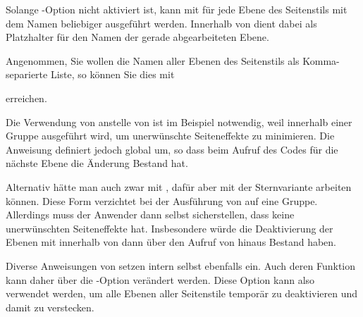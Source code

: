 \begin{Declaration}
\end{Declaration}
%
%
Solange \KOMAScript-Option  nicht
aktiviert ist, kann mit  für jede Ebene des
Seitenstils mit dem Namen  beliebiger 
ausgeführt werden. Innerhalb von  dient dabei  als
Platzhalter für den Namen der gerade abgearbeiteten Ebene.
\begin{Example}
  Angenommen, Sie wollen die Namen aller Ebenen des Seitenstils
   als Komma-separierte Liste, so können Sie dies mit
\begin{lstcode}
  \newcommand*\commaatlist{}
  \ForEachLayerOfPageStyle{scrheadings}{%
    \commaatlist#1\gdef\commaatlist{, }}
  \let\commaatlist\relax
\end{lstcode}
  erreichen.
\end{Example}
Die Verwendung von  anstelle von  ist im Beispiel
notwendig, weil  innerhalb einer Gruppe
ausgeführt wird, um unerwünschte Seiteneffekte zu minimieren. Die Anweisung
 definiert  jedoch global um, so dass beim
Aufruf des Codes für die nächste Ebene die Änderung Bestand hat.

Alternativ hätte man auch zwar mit
, dafür aber mit der Sternvariante 
arbeiten können. Diese Form verzichtet bei der Ausführung von  auf
eine Gruppe. Allerdings muss der Anwender dann selbst
sicherstellen, dass  keine unerwünschten Seiteneffekte
hat. Insbesondere würde die Deaktivierung der Ebenen mit
 innerhalb von  dann
über den Aufruf von  hinaus Bestand haben.

Diverse Anweisungen von  setzen intern selbst ebenfalls
 ein. Auch deren Funktion kann daher über die
\KOMAScript-Option  verändert werden. Diese
Option kann also verwendet werden, um alle Ebenen aller Seitenstile temporär
zu deaktivieren und damit zu verstecken.%
\EndIndexGroup


